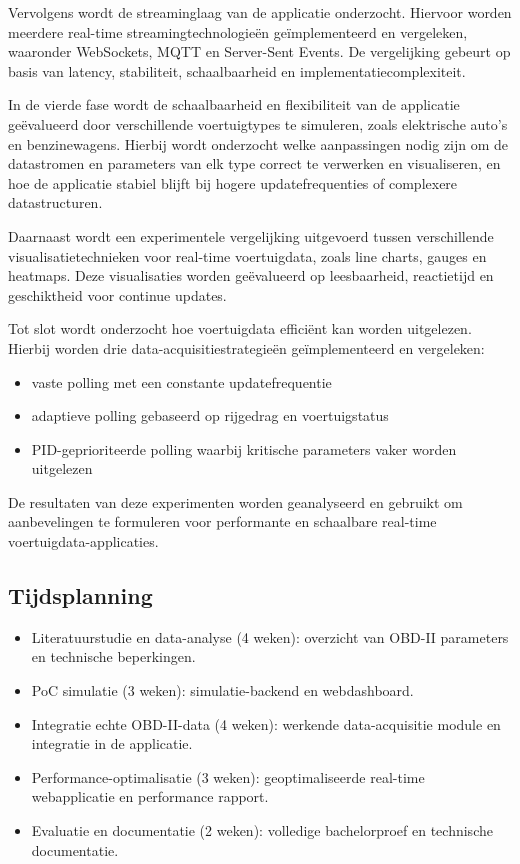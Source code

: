 Vervolgens wordt de streaminglaag van de applicatie onderzocht. Hiervoor worden meerdere real-time streamingtechnologieën geïmplementeerd en vergeleken, waaronder WebSockets, MQTT en Server-Sent Events. De vergelijking gebeurt op basis van latency, stabiliteit, schaalbaarheid en implementatiecomplexiteit.

In de vierde fase wordt de schaalbaarheid en flexibiliteit van de applicatie geëvalueerd door verschillende voertuigtypes te simuleren, zoals elektrische auto’s en benzinewagens. Hierbij wordt onderzocht welke aanpassingen nodig zijn om de datastromen en parameters van elk type correct te verwerken en visualiseren, en hoe de applicatie stabiel blijft bij hogere updatefrequenties of complexere datastructuren.

Daarnaast wordt een experimentele vergelijking uitgevoerd tussen verschillende visualisatietechnieken voor real-time voertuigdata, zoals line charts, gauges en heatmaps. Deze visualisaties worden geëvalueerd op leesbaarheid, reactietijd en geschiktheid voor continue updates.

Tot slot wordt onderzocht hoe voertuigdata efficiënt kan worden uitgelezen. Hierbij worden drie data-acquisitiestrategieën geïmplementeerd en vergeleken:
\begin{itemize}
    \item vaste polling met een constante updatefrequentie
    \item adaptieve polling gebaseerd op rijgedrag en voertuigstatus
    \item PID-geprioriteerde polling waarbij kritische parameters vaker worden uitgelezen
\end{itemize}

De resultaten van deze experimenten worden geanalyseerd en gebruikt om aanbevelingen te formuleren voor performante en schaalbare real-time voertuigdata-applicaties.


\subsection{Tijdsplanning}

\begin{itemize}
    \item Literatuurstudie en data-analyse (4 weken): overzicht van OBD-II parameters en technische beperkingen.
    \item PoC simulatie (3 weken): simulatie-backend en webdashboard.
    \item Integratie echte OBD-II-data (4 weken): werkende data-acquisitie module en integratie in de applicatie.
    \item Performance-optimalisatie (3 weken): geoptimaliseerde real-time webapplicatie en performance rapport.
    \item Evaluatie en documentatie (2 weken): volledige bachelorproef en technische documentatie.
\end{itemize}

